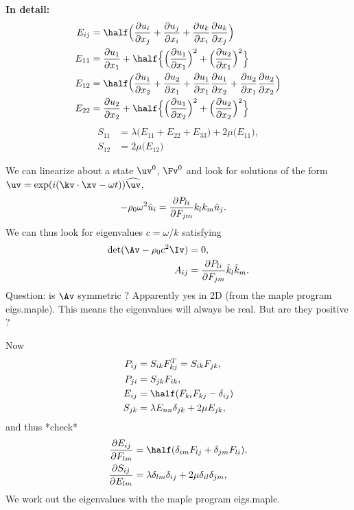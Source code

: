 {\bf In detail:}
\begin{align}
   E_{ij} &= \half\Big( \frac{\partial u_i}{\partial x_j} + \frac{\partial u_j}{\partial x_i} + 
                       \frac{\partial u_k}{\partial x_i}\frac{\partial u_k}{\partial x_j} \Big) \\
  E_{11} &= \frac{\partial u_1}{\partial x_1} + \half\Big\{  \Big(\frac{\partial u_1}{\partial x_1}\Big)^2 +
                                                           \Big(\frac{\partial u_2}{\partial x_1}\Big)^2 \Big\} \\
  E_{12} &= \half\Big( \frac{\partial u_1}{\partial x_2} + \frac{\partial u_2}{\partial x_1}
              +   \frac{\partial u_1}{\partial x_1}\frac{\partial u_1}{\partial x_2}
                            +\frac{\partial u_2}{\partial x_1}\frac{\partial u_2}{\partial x_2}   \Big) \\
  E_{22} &= \frac{\partial u_2}{\partial x_2} + \half\Big\{  \Big(\frac{\partial u_1}{\partial x_2}\Big)^2 +
                                                           \Big(\frac{\partial u_2}{\partial x_2}\Big)^2 \Big\} 
\end{align}
\begin{align}
  S_{11} &=  \lambda \Big(  E_{11} + E_{22} + E_{33} \Big) + 2\mu\Big(  E_{11} \Big), \\
  S_{12} &=   2\mu\Big( E_{12} \Big) 
\end{align}

We can linearize about a state $\uv^0$, $\Fv^0$ and look for solutions of the
form $\uv = \exp( i(\kv\cdot\xv - \omega t)) \widehat{\uv}$,
\begin{align}
  -\rho_0 \omega^2 \hat{u}_i   &= {\partial P_{li} \over\partial F_{jm}} k_l k_m \hat{u}_j .
\end{align}
We can thus look for eigenvalues $c = \omega/k$ satisfying
\begin{align}
  \det( \Av- \rho_0 c^2 \Iv ) &=0 , \\
  A_{ij} &= {\partial P_{li} \over\partial F_{jm}} \hat{k}_l \hat{k}_m .
\end{align}
Question: is $\Av$ symmetric ? Apparently yes in 2D (from the maple program eigs.maple). 
This means the eigenvalues will always be real. But are they positive ? 

% 
Now 
\begin{align}
  P_{ij} &= S_{ik} F^T_{kj} = S_{ik}  F_{jk}, \\
  P_{ji} &= S_{jk}  F_{ik}, \\
  E_{ij} &= \half( F_{ki} F_{kj} - \delta_{ij}) \\
  S_{jk} &= \lambda E_{nn}\delta_{jk} + 2\mu E_{jk},
\end{align}
and thus *check*
\begin{align}
 {\partial  E_{ij}\over\partial F_{lm}} &= \half( \delta_{im}F_{lj} + \delta_{jm}F_{li} ) , \\
 {\partial S_{ij} \over\partial E_{lm}} &= \lambda \delta_{lm}\delta_{ij} + 2\mu \delta_{il}\delta_{jm}, 
\end{align}
We work out the eigenvalues with the maple program eigs.maple.

